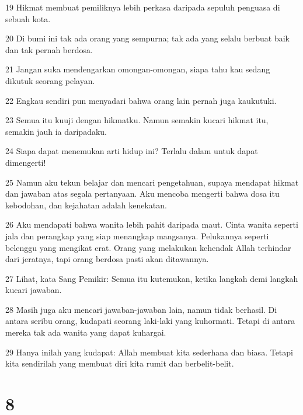 \par 19 Hikmat membuat pemiliknya lebih perkasa daripada sepuluh penguasa di sebuah kota.
\par 20 Di bumi ini tak ada orang yang sempurna; tak ada yang selalu berbuat baik dan tak pernah berdosa.
\par 21 Jangan suka mendengarkan omongan-omongan, siapa tahu kau sedang dikutuk seorang pelayan.
\par 22 Engkau sendiri pun menyadari bahwa orang lain pernah juga kaukutuki.
\par 23 Semua itu kuuji dengan hikmatku. Namun semakin kucari hikmat itu, semakin jauh ia daripadaku.
\par 24 Siapa dapat menemukan arti hidup ini? Terlalu dalam untuk dapat dimengerti!
\par 25 Namun aku tekun belajar dan mencari pengetahuan, supaya mendapat hikmat dan jawaban atas segala pertanyaan. Aku mencoba mengerti bahwa dosa itu kebodohan, dan kejahatan adalah kenekatan.
\par 26 Aku mendapati bahwa wanita lebih pahit daripada maut. Cinta wanita seperti jala dan perangkap yang siap menangkap mangsanya. Pelukannya seperti belenggu yang mengikat erat. Orang yang melakukan kehendak Allah terhindar dari jeratnya, tapi orang berdosa pasti akan ditawannya.
\par 27 Lihat, kata Sang Pemikir: Semua itu kutemukan, ketika langkah demi langkah kucari jawaban.
\par 28 Masih juga aku mencari jawaban-jawaban lain, namun tidak berhasil. Di antara seribu orang, kudapati seorang laki-laki yang kuhormati. Tetapi di antara mereka tak ada wanita yang dapat kuhargai.
\par 29 Hanya inilah yang kudapat: Allah membuat kita sederhana dan biasa. Tetapi kita sendirilah yang membuat diri kita rumit dan berbelit-belit.

\chapter{8}

